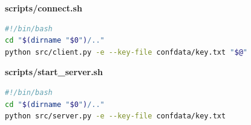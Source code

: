 \documentclass[areasetadvanced]{scrartcl}
\begin{document}
\textbf{scripts/connect.sh}
\begin{lstlisting}[language=bash]
#!/bin/bash
cd "$(dirname "$0")/.."
python src/client.py -e --key-file confdata/key.txt "$@"
\end{lstlisting}

\textbf{scripts/start\_server.sh}
\begin{lstlisting}[language=bash]
#!/bin/bash
cd "$(dirname "$0")/.."
python src/server.py -e --key-file confdata/key.txt
\end{lstlisting}
\end{document}
